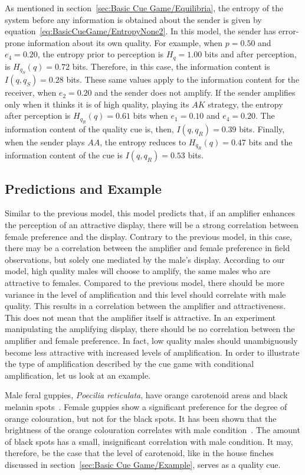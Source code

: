 \documentclass[a4paper,12pt]{article}
\numberwithin{equation}{section}
\begin{document}
As mentioned in section~\ref{sec:Basic Cue Game/Equilibria}, the entropy of the system before any information is obtained about the sender is given by equation~\ref{eq:BasicCueGame/EntropyNone2}. In this model, the sender has error-prone information about its own quality. For example, when $p = 0.50$ and $e_{4} = 0.20$, the entropy prior to perception is $H_{q} = 1.00$ bits and after perception, is $H_{q_{S}}(q) = 0.72$ bits. Therefore, in this case, the information content is $I(q, q_{S}) = 0.28$ bits. These same values apply to the information content for the receiver, when $e_{2} = 0.20$ and the sender does not amplify. If the sender amplifies only when it thinks it is of high quality, playing its $AK$ strategy, the entropy after perception is $H_{q_{R}}(q) = 0.61$ bits when $e_{1} = 0.10$ and $e_{4} = 0.20$. The information content of the quality cue is, then, $I(q, q_{R}) = 0.39$ bits. Finally, when the sender plays $AA$, the entropy reduces to $H_{q_{R}}(q) = 0.47$ bits and the information content of the cue is $I(q, q_{R}) = 0.53$ bits.


\subsection{Predictions and Example}
\label{sec:Cue Game with Conditional Amplification/Example}

Similar to the previous model, this model predicts that, if an amplifier enhances the perception of an attractive display, there will be a strong correlation between female preference and the display. Contrary to the previous model, in this case, there may be a correlation between the amplifier and female preference in field observations, but solely one mediated by the male's display. According to our model, high quality males will choose to amplify, the same males who are attractive to females. Compared to the previous model, there should be more variance in the level of amplification and this level should correlate with male quality. This results in a correlation between the amplifier and attractiveness. This does not mean that the amplifier itself is attractive. In an experiment manipulating the amplifying display, there should be no correlation between the amplifier and female preference. In fact, low quality males should unambiguously become less attractive with increased levels of amplification. In order to illustrate the type of amplification described by the cue game with conditional amplification, let us look at an example.

Male feral guppies, \textit{Poecilia reticulata}, have orange carotenoid areas and black melanin spots~\cite{Brooks1995}. Female guppies show a significant preference for the degree of orange colouration, but not for the black spots. It has been shown that the brightness of the orange colouration correlates with male condition~\cite{Nicoletto1993}. The amount of black spots has a small, insignificant correlation with male condition. It may, therefore, be the case that the level of carotenoid, like in the house finches discussed in section~\ref{sec:Basic Cue Game/Example}, serves as a quality cue. 
\end{document}
